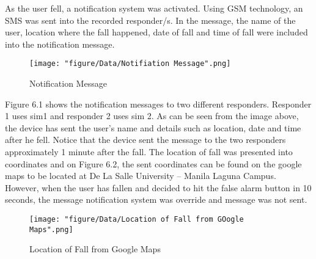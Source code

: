 As the user fell, a notification system was activated. Using GSM technology, an SMS was sent into the recorded responder/s. In the message, the name of the user, location where the fall happened, date of fall and time of fall were included into the notification message.

\begin{figure}[htbp]
	\centering
		\texttt{[image: "figure/Data/Notifiation Message".png]}
	\caption{Notification Message}
	\label{fig:Notifiation Message}
\end{figure}

Figure 6.1 shows the notification messages to two different responders. Responder 1 uses sim1 and responder 2 uses sim 2. As can be seen from the image above, the device has sent the user’s name and details such as location, date and time after he fell. Notice that the device sent the message to the two responders approximately 1 minute after the fall. The location of fall was presented into coordinates and on Figure 6.2, the sent coordinates can be found on the google maps to be located at De La Salle University – Manila Laguna Campus. However, when the user has fallen and decided to hit the false alarm button in 10 seconds, the message notification system was override and message was not sent.

\begin{figure}[htbp]
	\centering
		\texttt{[image: "figure/Data/Location of Fall from GOogle Maps".png]}
	\caption{Location of Fall from Google Maps}
	\label{fig:Location of Fall from GOogle Maps}
\end{figure}
